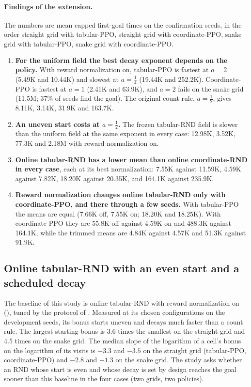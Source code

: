 \paragraph{Findings of the extension.}
The numbers are mean capped first-goal times on the confirmation seeds, in the order straight
grid with tabular-PPO, straight grid with coordinate-PPO, snake grid with tabular-PPO, snake grid
with coordinate-PPO.
\begin{enumerate}[leftmargin=*]
\item \textbf{For the uniform field the best decay exponent depends on the policy.} With reward
normalization on, tabular-PPO is fastest at $a=2$ (5.49K and 10.44K) and slowest at
$a=\tfrac14$ (19.44K and 252.2K). Coordinate-PPO is fastest at $a=1$ (2.41K and 63.9K), and
$a=2$ fails on the snake grid (11.5M; 37\% of seeds find the goal). The original count rule,
$a=\tfrac12$, gives 8.11K, 3.14K, 31.9K and 163.7K.
\item \textbf{An uneven start costs at $a=\tfrac12$.} The frozen tabular-RND field is slower than
the uniform field at the same exponent in every case: 12.98K, 3.52K, 77.3K and 2.18M with reward
normalization on.
\item \textbf{Online tabular-RND has a lower mean than online coordinate-RND in every case},
each at its best normalization: 7.55K against 11.59K, 4.59K against 7.82K, 18.20K against
20.35K, and 164.1K against 235.9K.
\item \textbf{Reward normalization changes online tabular-RND only with coordinate-PPO, and
there through a few seeds.} With tabular-PPO the means are equal (7.66K off, 7.55K on; 18.20K
and 18.25K). With coordinate-PPO they are 55.8K off against 4.59K on and 488.3K against 164.1K,
while the trimmed means are 4.84K against 4.57K and 51.3K against 91.9K.
\end{enumerate}

\subsection{Online tabular-RND with an even start and a scheduled decay}
\label{sec:grid-schedule-fit}
The baseline of this study is online tabular-RND with reward normalization on
(), tuned by the protocol of .
Measured at its chosen configurations on the development seeds, its bonus starts uneven and
decays much faster than a count rule. The largest starting bonus is 3.6 times the smallest on
the straight grid and 4.5 times on the snake grid. The median slope of the logarithm of a cell's
bonus on the logarithm of its visits is $-3.3$ and $-3.5$ on the straight grid (tabular-PPO,
coordinate-PPO) and $-2.8$ and $-1.3$ on the snake grid. The study asks whether an RND whose
start is even and whose decay is set by design reaches the goal sooner than this baseline in the
four cases (two grids, two policies).

